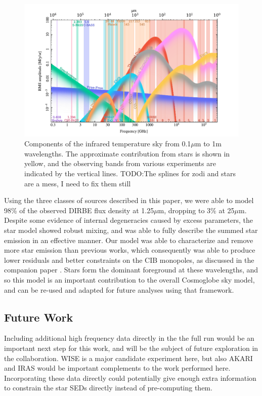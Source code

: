 \documentclass{aa}
\begin{document}
\begin{figure}
  \centering
  \includegraphics[width=1.1\textwidth]{figs/sed/cg_spec.pdf}
  \caption{Components of the infrared temperature sky from 0.1$\mu$m to 1m wavelengths. The approximate contribution from stars is shown in yellow, and the observing bands from various experiments are indicated by the vertical lines. TODO:The splines for zodi and stars are a mess, I need to fix them still}
  \label{fig:sed}
\end{figure}

Using the three classes of sources described in this paper, we were able to model 98\% of the observed DIRBE flux density at 1.25$\mu$m, dropping to 3\% at 25$\mu$m. Despite some evidence of internal degeneracies caused by excess parameters, the star model showed robust mixing, and was able to fully describe the summed star emission in an effective manner. Our model was able to characterize and remove more star emission than previous works, which consequently was able to produce lower residuals and better constraints on the CIB monopoles, as discussed in the companion paper \citet{CG02_03}. Stars form the dominant foreground at these wavelengths, and so this model is an important contribution to the overall Cosmoglobe sky model, and can be re-used and adapted for future analyses using that framework.

\subsection{Future Work}

Including additional high frequency data directly in the the full run would be an important next step for this work, and will be the subject of future exploration in the collaboration. WISE is a major candidate experiment here, but also   AKARI \citep{akari} and IRAS \citep{iras} would be important complements to the work performed here. Incorporating these data directly could potentially give enough extra information to constrain the star SEDs directly instead of pre-computing them.
\end{document}
